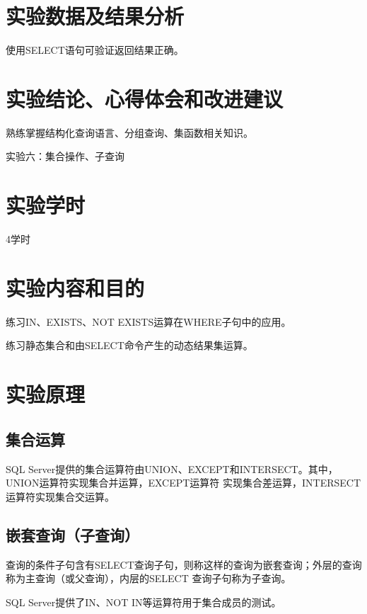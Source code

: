 \documentclass[a4paper]{uestcreport}
\begin{document}
\section{实验数据及结果分析}
使用SELECT语句可验证返回结果正确。

\section{实验结论、心得体会和改进建议}
熟练掌握结构化查询语言、分组查询、集函数相关知识。

\newpage
\begin{center}
    \Large
    实验六：集合操作、子查询
\end{center}

\setcounter{section}{0}
\section{实验学时}
4学时

\section{实验内容和目的}
练习IN、EXISTS、NOT EXISTS运算在WHERE子句中的应用。

练习静态集合和由SELECT命令产生的动态结果集运算。

\section{实验原理}
\subsection{集合运算}
SQL Server提供的集合运算符由UNION、EXCEPT和INTERSECT。其中，UNION运算符实现集合并运算，EXCEPT运算符
实现集合差运算，INTERSECT运算符实现集合交运算。

\subsection{嵌套查询（子查询）}
查询的条件子句含有SELECT查询子句，则称这样的查询为嵌套查询；外层的查询称为主查询（或父查询），内层的SELECT
查询子句称为子查询。

SQL Server提供了IN、NOT IN等运算符用于集合成员的测试。
\end{document}
